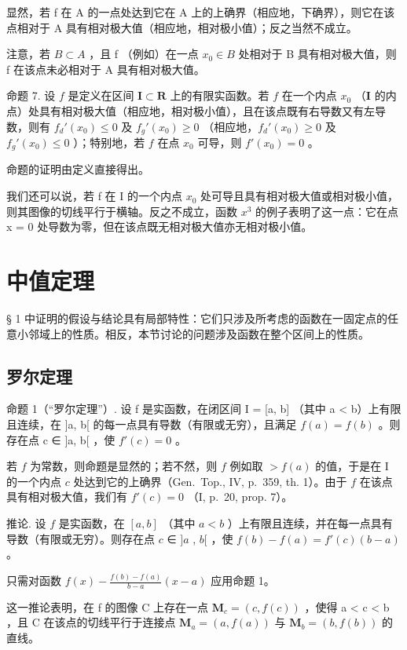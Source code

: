 显然，若 f 在 A 的一点处达到它在 A 上的上确界（相应地，下确界），则它在该点相对于 A 具有相对极大值（相应地，相对极小值）；反之当然不成立。

注意，若 \(B \subset A\) ，且 f （例如）在一点 \(x_{0} \in B\) 处相对于 B 具有相对极大值，则 f 在该点未必相对于 A 具有相对极大值。

命题 7. 设 \(f\) 是定义在区间 \(\mathbf{I} \subset \mathbf{R}\) 上的有限实函数。若 \(f\) 在一个内点 \(x_0\) （\(\mathbf{I}\) 的内点）处具有相对极大值（相应地，相对极小值），且在该点既有右导数又有左导数，则有 \(f_d'(x_0) \leqslant 0\) 及 \(f_g'(x_0) \geqslant 0\) （相应地，\(f_d'(x_0) \geqslant 0\) 及 \(f_g'(x_0) \leqslant 0\) ）；特别地，若 \(f\) 在点 \(x_0\) 可导，则 \(f'(x_0) = 0\) 。

命题的证明由定义直接得出。

我们还可以说，若 f 在 I 的一个内点 \(x_{0}\) 处可导且具有相对极大值或相对极小值，则其图像的切线平行于横轴。反之不成立，函数 \(x^{3}\) 的例子表明了这一点：它在点 x = 0 处导数为零，但在该点既无相对极大值亦无相对极小值。

\section{中值定理}

§ 1 中证明的假设与结论具有局部特性：它们只涉及所考虑的函数在一固定点的任意小邻域上的性质。相反，本节讨论的问题涉及函数在整个区间上的性质。

\subsection{罗尔定理}

命题 1（“罗尔定理”）. 设 f 是实函数，在闭区间 I = {[}a, b{]} （其中 a \textless{} b）上有限且连续，在 {]}a, b{[} 的每一点具有导数（有限或无穷），且满足 \(f(a) = f(b)\) 。则存在点 c ∈ {]}a, b{[} ，使 \(f'(c) = 0\) 。

若 \(f\) 为常数，则命题是显然的；若不然，则 \(f\) 例如取 \(> f(a)\) 的值，于是在 I 的一个内点 \(c\) 处达到它的上确界（Gen.~Top., IV, p.~359, th. 1）。由于 \(f\) 在该点具有相对极大值，我们有 \(f'(c) = 0\) （I, p.~20, prop. 7）。

推论. 设 \(f\) 是实函数，在 \([a, b]\) （其中 \(a < b\) ）上有限且连续，并在每一点具有导数（有限或无穷）。则存在点 \(c\) ∈ \(]a\) , \(b[\) ，使 \(f(b) - f(a) = f'(c)(b - a)\) 。

只需对函数 \(f(x) - \frac{f(b) - f(a)}{b - a} (x - a)\) 应用命题 1。

这一推论表明，在 f 的图像 C 上存在一点 \(\mathbf{M}_{c} = (c, f(c))\) ，使得 a \textless{} c \textless{} b ，且 C 在该点的切线平行于连接点 \(\mathbf{M}_{a} = (a, f(a))\) 与 \(\mathbf{M}_{b} = (b, f(b))\) 的直线。


